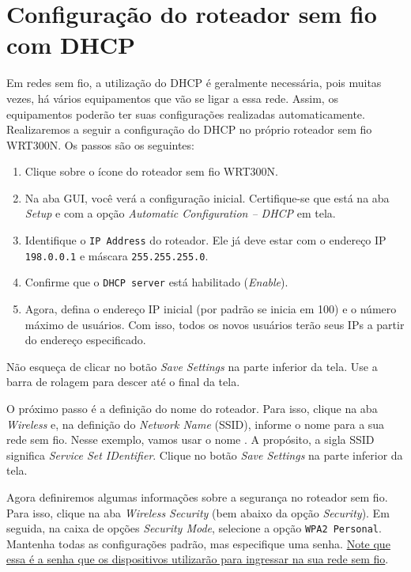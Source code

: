 \section{Configuração do roteador sem fio com DHCP}
Em redes sem fio, a utilização do DHCP é geralmente necessária, pois muitas vezes, há vários equipamentos que vão se ligar a essa rede. Assim, os equipamentos poderão ter suas configurações realizadas automaticamente. Realizaremos a seguir a configuração do DHCP no próprio roteador sem fio WRT300N. Os passos são os seguintes:

\begin{enumerate}[label*=\arabic*.]
  \item Clique sobre o ícone do roteador sem fio WRT300N.
  \item Na aba GUI, você verá a configuração inicial. Certifique-se que está na aba \textit{Setup} e com a opção \textit{Automatic Configuration -- DHCP} em tela.
  \item Identifique o \texttt{IP Address} do roteador. Ele já deve estar com o endereço IP \texttt{198.0.0.1} e máscara \texttt{255.255.255.0}.
  \item Confirme que o \texttt{DHCP server} está habilitado (\textit{Enable}).
  \item Agora, defina o endereço IP inicial (por padrão se inicia em 100) e o número máximo de usuários. Com isso, todos os novos usuários terão seus IPs a partir do endereço especificado. 
\end{enumerate}

Não esqueça de clicar no botão \textit{Save Settings} na parte inferior da tela. Use a barra de rolagem para descer até o final da tela.

O próximo passo é a definição do nome do roteador. Para isso, clique na aba \textit{Wireless} e, na definição do \textit{Network Name} (SSID), informe o nome para a sua rede sem fio. Nesse exemplo, vamos usar o nome . A propósito, a sigla SSID significa \textit{Service Set IDentifier}. Clique no botão \textit{Save Settings} na parte inferior da tela.

Agora definiremos algumas informações sobre a segurança no roteador sem fio. Para isso, clique na aba \textit{Wireless Security} (bem abaixo da opção \textit{Security}). Em seguida, na caixa de opções \textit{Security Mode}, selecione a opção \texttt{WPA2 Personal}. Mantenha todas as configurações padrão, mas especifique uma senha. \underline{Note que essa é a senha que os dispositivos utilizarão para ingressar na sua rede sem fio}.

